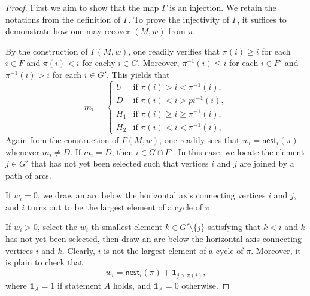 \documentclass[12pt]{article}
\numberwithin{equation}{section}
\theoremstyle{plain}
\def\nest{\mathsf{nest}}
\begin{document}
    	 	\begin{proof}
    	 		First we aim to show that the map $\Gamma$ is an injection. We retain the notations from the definition of $\Gamma$. To prove the injectivity of $\Gamma$, it suffices to demonstrate how one may recover $(M,w)$ from $\pi$.
    	 		
    	 		By the construction of $\Gamma(M,w)$, one readily verifies that $\pi(i)\geq i$ for each $i\in F$ and $\pi(i)<i$ for eachy $i\in G$. Moreover, $\pi^{-1}(i)\leq i$ for each $i\in F'$ and $\pi^{-1}(i)>i$ for each $i\in G'$. This yields that
    	 	\begin{equation}\label{eq-steps}
    	 		m_i=
    	 		\begin{cases}
    	 			U & \text{if } \pi(i)>i<\pi^{-1}(i), \\
    	 			D & \text{if } \pi(i)<i>pi^{-1}(i), \\
    	 			H_1 & \text{if } \pi(i)\geq i\geq \pi^{-1}(i), \\
    	 			H_2 & \text{if } \pi(i)<i<\pi^{-1}(i),
    	 		\end{cases}
    	 	\end{equation}
    	 		Again from the construction of $\Gamma(M,w)$, one readily sees that $w_i=\nest_i(\pi)$ whenever $m_i\neq D$. If $m_i=D$, then $i\in G\cap F'$. In this case, we locate the element $j\in G'$ that has not yet been selected such that vertices $i$ and $j$ are joined by a path of arcs.
    	 		
    	 		If $w_i=0$, we draw an arc below the horizontal axis connecting vertices $i$ and $j$, and $i$ turns out to be the largest element of a cycle of $\pi$.
    	 		
    	 		 If $w_i>0$, select the $w_i$-th smallest element $k\in G'\setminus\{j\}$ satisfying that $k<i$ and $k$ has not yet been selected, then draw an arc below the horizontal axis connecting vertices $i$ and $k$. Clearly,  $i$ is not the largest element of a cycle of $\pi$. Moreover, it  is  plain to check that 
    	 		\[
    	 		w_i=\nest_i(\pi)+\mathbf{1}_{j>\pi(i)},
    	 		\]
    	 		where $\mathbf{1}_{A}=1$ if statement $A$ holds, and $\mathbf{1}_{A}=0$ otherwise.
    	 		

\end{proof}
\end{document}
